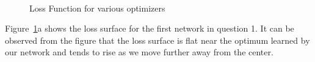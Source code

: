 \documentclass[12pt]{report}
\begin{document}
\begin{figure}[H]
	\\
	\caption{Loss Function for various optimizers}
	\label{fig:1}
\end{figure}

Figure~\ref{fig:1}a shows the loss surface for the first network in question 1. It can be observed from the figure that the loss surface is flat near the optimum learned by our network and tends to rise as we move further away from the center.  
\end{document}
